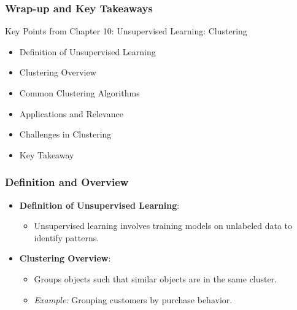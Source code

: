 \documentclass[aspectratio=169]{beamer}
\begin{document}
\begin{frame}[fragile]
    \frametitle{Wrap-up and Key Takeaways}

    \begin{block}{Key Points from Chapter 10: Unsupervised Learning: Clustering}
        \begin{itemize}
            \item Definition of Unsupervised Learning
            \item Clustering Overview
            \item Common Clustering Algorithms
            \item Applications and Relevance
            \item Challenges in Clustering
            \item Key Takeaway
        \end{itemize}
    \end{block}
\end{frame}

\begin{frame}[fragile]
    \frametitle{Definition and Overview}

    \begin{itemize}
        \item \textbf{Definition of Unsupervised Learning}:
        \begin{itemize}
            \item Unsupervised learning involves training models on unlabeled data to identify patterns.
        \end{itemize}
        
        \item \textbf{Clustering Overview}:
        \begin{itemize}
            \item Groups objects such that similar objects are in the same cluster.
            \item \textit{Example:} Grouping customers by purchase behavior.
        \end{itemize}
    \end{itemize}
\end{frame}
\end{document}
